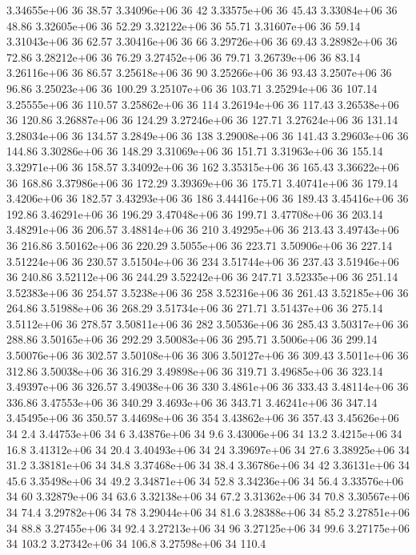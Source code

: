 3.34655e+06 36 38.57
3.34096e+06 36 42
3.33575e+06 36 45.43
3.33084e+06 36 48.86
3.32605e+06 36 52.29
3.32122e+06 36 55.71
3.31607e+06 36 59.14
3.31043e+06 36 62.57
3.30416e+06 36 66
3.29726e+06 36 69.43
3.28982e+06 36 72.86
3.28212e+06 36 76.29
3.27452e+06 36 79.71
3.26739e+06 36 83.14
3.26116e+06 36 86.57
3.25618e+06 36 90
3.25266e+06 36 93.43
3.2507e+06 36 96.86
3.25023e+06 36 100.29
3.25107e+06 36 103.71
3.25294e+06 36 107.14
3.25555e+06 36 110.57
3.25862e+06 36 114
3.26194e+06 36 117.43
3.26538e+06 36 120.86
3.26887e+06 36 124.29
3.27246e+06 36 127.71
3.27624e+06 36 131.14
3.28034e+06 36 134.57
3.2849e+06 36 138
3.29008e+06 36 141.43
3.29603e+06 36 144.86
3.30286e+06 36 148.29
3.31069e+06 36 151.71
3.31963e+06 36 155.14
3.32971e+06 36 158.57
3.34092e+06 36 162
3.35315e+06 36 165.43
3.36622e+06 36 168.86
3.37986e+06 36 172.29
3.39369e+06 36 175.71
3.40741e+06 36 179.14
3.4206e+06 36 182.57
3.43293e+06 36 186
3.44416e+06 36 189.43
3.45416e+06 36 192.86
3.46291e+06 36 196.29
3.47048e+06 36 199.71
3.47708e+06 36 203.14
3.48291e+06 36 206.57
3.48814e+06 36 210
3.49295e+06 36 213.43
3.49743e+06 36 216.86
3.50162e+06 36 220.29
3.5055e+06 36 223.71
3.50906e+06 36 227.14
3.51224e+06 36 230.57
3.51504e+06 36 234
3.51744e+06 36 237.43
3.51946e+06 36 240.86
3.52112e+06 36 244.29
3.52242e+06 36 247.71
3.52335e+06 36 251.14
3.52383e+06 36 254.57
3.5238e+06 36 258
3.52316e+06 36 261.43
3.52185e+06 36 264.86
3.51988e+06 36 268.29
3.51734e+06 36 271.71
3.51437e+06 36 275.14
3.5112e+06 36 278.57
3.50811e+06 36 282
3.50536e+06 36 285.43
3.50317e+06 36 288.86
3.50165e+06 36 292.29
3.50083e+06 36 295.71
3.5006e+06 36 299.14
3.50076e+06 36 302.57
3.50108e+06 36 306
3.50127e+06 36 309.43
3.5011e+06 36 312.86
3.50038e+06 36 316.29
3.49898e+06 36 319.71
3.49685e+06 36 323.14
3.49397e+06 36 326.57
3.49038e+06 36 330
3.4861e+06 36 333.43
3.48114e+06 36 336.86
3.47553e+06 36 340.29
3.4693e+06 36 343.71
3.46241e+06 36 347.14
3.45495e+06 36 350.57
3.44698e+06 36 354
3.43862e+06 36 357.43
3.45626e+06 34 2.4
3.44753e+06 34 6
3.43876e+06 34 9.6
3.43006e+06 34 13.2
3.4215e+06 34 16.8
3.41312e+06 34 20.4
3.40493e+06 34 24
3.39697e+06 34 27.6
3.38925e+06 34 31.2
3.38181e+06 34 34.8
3.37468e+06 34 38.4
3.36786e+06 34 42
3.36131e+06 34 45.6
3.35498e+06 34 49.2
3.34871e+06 34 52.8
3.34236e+06 34 56.4
3.33576e+06 34 60
3.32879e+06 34 63.6
3.32138e+06 34 67.2
3.31362e+06 34 70.8
3.30567e+06 34 74.4
3.29782e+06 34 78
3.29044e+06 34 81.6
3.28388e+06 34 85.2
3.27851e+06 34 88.8
3.27455e+06 34 92.4
3.27213e+06 34 96
3.27125e+06 34 99.6
3.27175e+06 34 103.2
3.27342e+06 34 106.8
3.27598e+06 34 110.4
